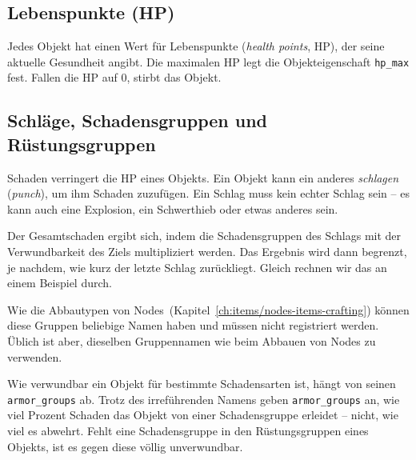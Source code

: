 \subsection{Lebenspunkte (HP)}\label{lebenspunkte-hp}

Jedes Objekt hat einen Wert für
Lebenspunkte (\emph{health points},
HP), der seine aktuelle Gesundheit angibt. Die maximalen HP legt die
Objekteigenschaft \texttt{hp\_\allowbreak{}max} fest. Fallen die HP auf
0, stirbt das Objekt.

\begin{Shaded}
\begin{Highlighting}[]
  \OperatorTok{=} \OperatorTok{:}\OperatorTok{()}
\OperatorTok{:}\OperatorTok{(} \OperatorTok{+} \OperatorTok{)}
\end{Highlighting}
\end{Shaded}

\subsection{Schläge, Schadensgruppen und
Rüstungsgruppen}\label{schluxe4ge-schadensgruppen-und-ruxfcstungsgruppen}

Schaden verringert die HP eines Objekts. Ein Objekt kann ein anderes
\emph{schlagen} (\emph{punch}), um ihm Schaden zuzufügen. Ein Schlag
muss kein echter Schlag sein -- es kann auch eine Explosion, ein
Schwerthieb oder etwas anderes sein.

Der Gesamtschaden ergibt sich, indem die
Schadensgruppen des Schlags mit der
Verwundbarkeit des Ziels multipliziert werden. Das Ergebnis wird dann
begrenzt, je nachdem, wie kurz der letzte Schlag zurückliegt. Gleich
rechnen wir das an einem Beispiel durch.

Wie die Abbautypen von
Nodes~(Kapitel~\ref{ch:items/nodes-items-crafting}) können diese
Gruppen beliebige Namen haben und müssen nicht
registriert werden. Üblich ist aber, dieselben Gruppennamen wie beim
Abbauen von Nodes zu verwenden.

Wie verwundbar ein Objekt für bestimmte Schadensarten ist, hängt von
seinen \texttt{armor\_\allowbreak{}groups} ab. Trotz des irreführenden
Namens geben \texttt{armor\_\allowbreak{}groups} an, wie viel Prozent
Schaden das Objekt von einer Schadensgruppe erleidet -- nicht, wie viel
es abwehrt. Fehlt eine Schadensgruppe in den Rüstungsgruppen eines
Objekts, ist es gegen diese völlig unverwundbar.

